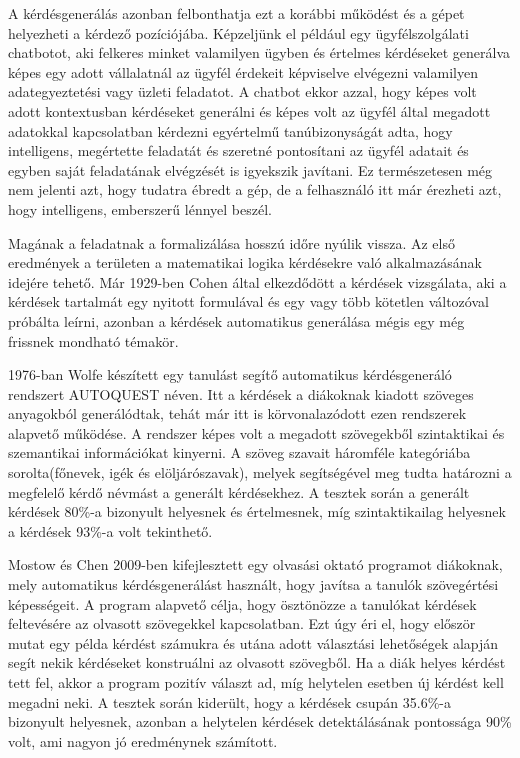 A kérdésgenerálás azonban felbonthatja ezt a korábbi működést és a gépet helyezheti a kérdező pozíciójába. Képzeljünk el például egy ügyfélszolgálati chatbotot, aki felkeres minket valamilyen ügyben és értelmes kérdéseket generálva képes egy adott vállalatnál az ügyfél érdekeit képviselve elvégezni valamilyen adategyeztetési vagy üzleti feladatot. A chatbot ekkor azzal, hogy képes volt adott kontextusban kérdéseket generálni és képes volt az ügyfél által megadott adatokkal kapcsolatban kérdezni egyértelmű tanúbizonyságát adta, hogy intelligens, megértette feladatát és szeretné pontosítani az ügyfél adatait és egyben saját feladatának elvégzését is igyekszik javítani. Ez természetesen még nem jelenti azt, hogy tudatra ébredt a gép, de a felhasználó itt már érezheti azt, hogy intelligens, emberszerű lénnyel beszél.

Magának a feladatnak a formalizálása hosszú időre nyúlik vissza. Az első eredmények a területen a matematikai logika kérdésekre való alkalmazásának idejére tehető. Már 1929-ben Cohen által elkezdődött a kérdések vizsgálata, aki a kérdések tartalmát egy nyitott formulával és egy vagy több kötetlen változóval próbálta leírni\cite{question_generation}, azonban a kérdések automatikus generálása mégis egy még frissnek mondható témakör.

1976-ban Wolfe készített egy tanulást segítő automatikus kérdésgeneráló rendszert AUTOQUEST néven. Itt a kérdések a diákoknak kiadott szöveges anyagokból generálódtak, tehát már itt is körvonalazódott ezen rendszerek alapvető működése. A rendszer képes volt a megadott szövegekből szintaktikai és szemantikai információkat kinyerni. A szöveg szavait háromféle kategóriába sorolta(főnevek, igék és elöljárószavak), melyek segítségével meg tudta határozni a megfelelő kérdő névmást a generált kérdésekhez. A tesztek során a generált kérdések 80\%-a bizonyult helyesnek és értelmesnek, míg szintaktikailag helyesnek a kérdések 93\%-a volt tekinthető. \cite{question_generation}

Mostow és Chen 2009-ben kifejlesztett egy olvasási oktató programot diákoknak, mely automatikus kérdésgenerálást használt, hogy javítsa a tanulók szövegértési képességeit. A program alapvető célja, hogy ösztönözze a tanulókat kérdések feltevésére az olvasott szövegekkel kapcsolatban. Ezt úgy éri el, hogy először mutat egy példa kérdést számukra és utána adott választási lehetőségek alapján segít nekik kérdéseket konstruálni az olvasott szövegből. Ha a diák helyes kérdést tett fel, akkor a program pozitív választ ad, míg helytelen esetben új kérdést kell megadni neki. A tesztek során kiderült, hogy a kérdések csupán 35.6\%-a bizonyult helyesnek, azonban a helytelen kérdések detektálásának pontossága 90\% volt, ami nagyon jó eredménynek számított.\cite{question_generation}

